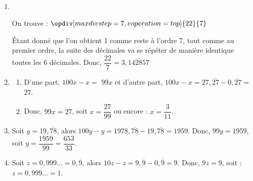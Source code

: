 \begin{corrige}
\ \\ [-5mm]
   \begin{enumerate}
      \item \\
         \begin{minipage}{8cm}
            On trouve : $\opdiv[maxdivstep=7,voperation=top]{22}{7}$ \medskip
         \end{minipage}
         \begin{minipage}{6cm}
            Étant donné que l'on obtient 1 comme reste à l'ordre 7, tout comme au premier ordre, la suite des décimales va se répéter de manière identique toutes les 6 décimales. Donc, {\blue $\dfrac{22}{7} =3,\overline{142857}$}
         \end{minipage}
      \item
         \begin{enumerate}
            \item D'une part, $100x-x =$ {\blue  $99x$} et d'autre part, $100x-x =27,\overline{27}-0,\overline{27} =$ {\blue $27$}. \smallskip
            \item Donc, $99x =27$, soit $x =\dfrac{27}{99}$ ou encore : {\blue $x =\dfrac{3}{11}$}. \smallskip
         \end{enumerate}
      \setcounter{enumi}{2}
      \item Soit $y =19,\overline{78}$, alors $100y-y =1978,\overline{78}-19,\overline{78} =1959$. Donc, $99y =1959$, soit $y =\dfrac{1959}{99} =${\blue $\dfrac{653}{33}$}. \smallskip
      \item Soit $z =0,999\dots =0,\overline{9}$, alors $10z-z =9,\overline{9}-0,\overline{9} =9$. Donc, $9z =9$, soit : {\blue $z =0,999\dots =1$.}
   \end{enumerate}
\end{corrige}

